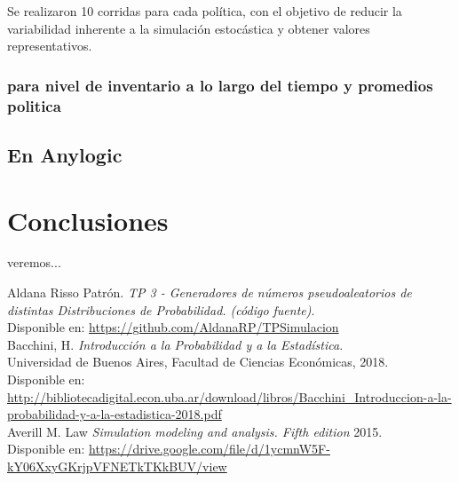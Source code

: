 \documentclass{article}
\begin{document}
Se realizaron 10 corridas para cada política, con el objetivo de reducir la variabilidad inherente a la simulación estocástica y obtener valores representativos.

\subsubsection{para nivel de inventario a lo largo del tiempo y promedios politica}

\subsection{En Anylogic}


\section{Conclusiones}

veremos...





  
\begin{thebibliography}{2}

Aldana Risso Patrón. \textit{TP 3 - Generadores de números pseudoaleatorios de distintas Distribuciones de Probabilidad. (código fuente)}.\\
Disponible en: \url{https://github.com/AldanaRP/TPSimulacion} \\

Bacchini, H. \textit{Introducción a la Probabilidad y a la Estadística}.\\
Universidad de Buenos Aires, Facultad de Ciencias Económicas, 2018.\\
Disponible en: \url{http://bibliotecadigital.econ.uba.ar/download/libros/Bacchini_Introduccion-a-la-probabilidad-y-a-la-estadistica-2018.pdf}\\

Averill M. Law \textit{Simulation modeling and analysis. Fifth edition }2015. \\
Disponible en:
\url{https://drive.google.com/file/d/1ycmnW5F-kY06XxyGKrjpVFNETkTKkBUV/view}

\end{thebibliography}
\end{document}
